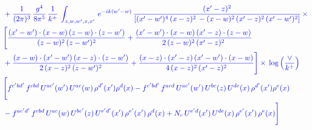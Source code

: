 \documentclass[10pt]{article}
\numberwithin{equation}{section}
\newcommand{\new}[1]{{\color{blue}#1}}
\newcommand{\nc}{\color{blue}}
\begin{document}
\begin{align}
& \nc   + \frac{1}{(2\pi)^{3}}\, \frac{g^{4}}{8\pi^{5}}\,\frac{1}{k^{+}}\,\int_{z,w,w^{\prime},x,x'}\, e^{-ik(w^{\prime}-w)}\, \frac{(x'-z)^{2}}{\left[(x'-w')^{4}\,(x-z)^{2}\, - (x-w)^{2}\, (x'-z)^{2}\,(x'-w')^{2}\right]}\,  \times\notag \\ & \nc  \Bigg[\frac{(x'-w')\cdot (x-w)\, (z-w)\cdot (z-w')}{(z-w)^{2}\, (z-w')^{2}}+\frac{(x'-w')\cdot (x-w)\, (x'-z)\cdot (z-w)}{2\, (z-w)^{2}\, (x'-z)^{2}}\notag \\ & \nc  +\frac{(x-w)\cdot (x'-w')\, (x-z)\cdot (z-w')}{2\, (x-z)^{2}\, (z-w')^{2}}+\frac{(x-z)\cdot (x'-z)\, (x'-w')\cdot (x-w)}{4\, (x-z)^{2}\, (x'-z)^{2}}\Bigg] \times\,\new{\log{\left(\frac{\vee}{k^{+}}\right)}} \notag \\ & \nc  \Bigg[f^{c'bd'}\,f^{cbd}\, U^{ac'}(w')\,U^{ac}(w)\,\rho^{d'}(x')\rho^{d}(x)- f^{c'bd'}\,f^{acd}\,U^{ac'}(w')\,U^{bc}(z)\,U^{de}(x)\,\rho^{d'}(x')\rho^{e}(x) \notag \\ & \nc  -f^{ac'd'}\,f^{cbd}\,U^{ac}(w)\,U^{bc'}(z)\,U^{e'd'}(x')\,\rho^{e'}(x')\,\rho^{d}(x) +N_{c}\,U^{e'd}(x')\,U^{de}(x)\,\rho^{e'}(x')\,\rho^{e}(x)\Bigg] \label{eq:Bnew:G2I2b}
\end{align}
\end{document}
